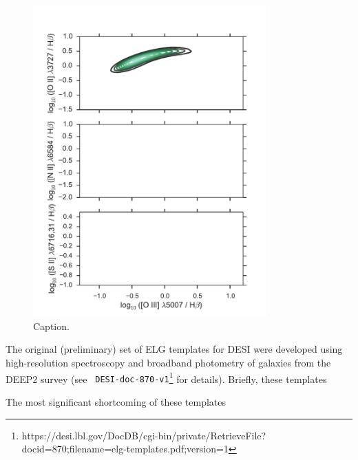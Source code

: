 \documentclass[11pt]{article}
\newcommand{\oiilam}{[O~{\sc ii}]~\ensuremath{\lambda\lambda3726,29}}
\begin{document}
\begin{figure}
\centering
\includegraphics[width=0.8\textwidth]{figures/oiiihb.pdf}
\caption{Caption. \label{fig:oiiihb}}
\end{figure}


The original (preliminary) set of ELG templates for DESI were developed using
high-resolution spectroscopy and broadband photometry of galaxies from the DEEP2
survey (see {\tt
  DESI-doc-870-v1}\footnote{https://desi.lbl.gov/DocDB/cgi-bin/private/RetrieveFile?docid=870;filename=elg-templates.pdf;version=1}
for details).  Briefly, these templates 

The most significant shortcoming of these templates 
\end{document}
